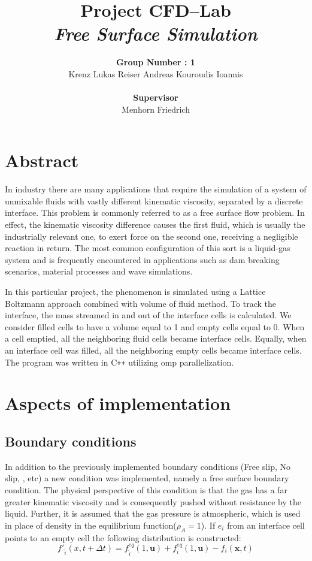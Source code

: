 \documentclass[10pt,a4paper,notitlepage]{article}
\begin{document}
\title{Project CFD--Lab\\ \textit{Free Surface Simulation}}
\author{\textbf{Group Number : 1}\\Krenz Lukas Reiser Andreas Kouroudis Ioannis \\ \\\textbf{Supervisor}\\Menhorn Friedrich }
\maketitle
\section*{Abstract}
In industry there are many applications that require the simulation of a system of unmixable fluids with vastly different kinematic viscosity, separated by a discrete interface.  This problem is commonly referred to as a free surface flow problem. In effect, the kinematic viscosity difference causes the first fluid, which is usually the industrially relevant one, to exert force on the second one, receiving a negligible reaction in return. The most common configuration of this sort is a liquid-gas system and is frequently encountered in applications such as dam breaking scenarios, material processes and wave simulations.

	In this particular project, the phenomenon is simulated  using a Lattice Boltzmann approach combined with volume of fluid method. To track the interface, the mass streamed in and out of the interface cells is calculated. We consider filled cells to have a volume equal to 1 and empty cells equal to 0. When a cell emptied, all the neighboring fluid cells became interface cells. Equally, when an interface cell was filled, all the neighboring empty cells became interface cells.
	The program was written in C\texttt{++} utilizing omp parallelization.
\\
\section{Aspects of implementation}
\subsection{Boundary conditions}
In addition to the previously implemented boundary conditions (Free slip, No slip, , etc) a new condition was implemented, namely a free surface boundary condition.
The physical perspective of this condition is that the gas has a far greater kinematic viscosity and is consequently pushed without resistance by the liquid. Further, it is assumed that the gas pressure is atmospheric, which is used in place of density in the equilibrium function($\rho_{A} = 1$).
If $e_{i}$ from an interface cell points to an empty cell the following distribution is constructed:
\begin{equation} \label{eq:dist}
f'_{\hat{i}} (x, t + \Delta t) = f^{eq}_{\hat{i}}(1, \mathbf{u})+f^{eq}_{{i}}(1, \mathbf{u})-f_{i}(\mathbf{x},t)
\end{equation}
\end{document}
